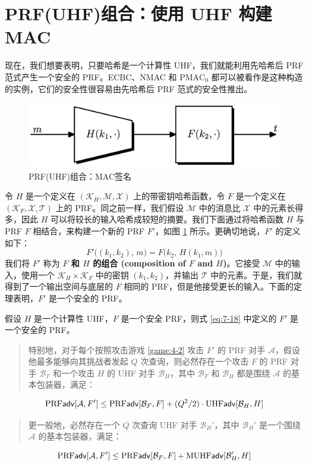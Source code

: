 \section{PRF(UHF)组合：使用 UHF 构建 MAC}

现在，我们想要表明，只要哈希是一个计算性 UHF，我们就能利用先哈希后 PRF 范式产生一个安全的 PRF。ECBC、NMAC 和 $\mathrm{PMAC}_0$ 都可以被看作是这种构造的实例，它们的安全性很容易由先哈希后 PRF 范式的安全性推出。

\begin{figure}
  \centering
  \includegraphics[width=0.5\linewidth]{figures/chapter7/fig3.png}
  \caption{PRF(UHF)组合：MAC签名}
  \label{fig:7-3}
\end{figure}

令 $H$ 是一个定义在 $(\mathcal{K}_H,\mathcal{M},\mathcal{X})$ 上的带密钥哈希函数，令 $F$ 是一个定义在 $(\mathcal{K}_F,\mathcal{X},\mathcal{T})$ 上的 PRF。同之前一样，我们假设 $\mathcal{M}$ 中的消息比 $\mathcal{X}$ 中的元素长得多，因此 $H$ 可以将较长的输入哈希成较短的摘要。我们下面通过将哈希函数 $H$ 与 PRF $F$ 相结合，来构建一个新的 PRF $F'$，如图 \ref{fig:7-3} 所示。更确切地说，$F'$ 的定义如下：
\begin{equation}\label{eq:7-18}
F'\big((k_1,k_2),\,m\big)=F\big(k_2,\,H(k_1,m)\big)
\end{equation}
我们将 $F'$ 称为 \textbf{$F$ 和 $H$ 的组合 (composition of $F$ and $H$)}。它接受 $\mathcal{M}$ 中的输入，使用一个 $\mathcal{K}_H\times\mathcal{K}_F$ 中的密钥 $(k_1,k_2)$，并输出 $\mathcal{T}$ 中的元素。于是，我们就得到了一个输出空间与底层的 $F$ 相同的 PRF，但是他接受更长的输入。下面的定理表明，$F'$ 是一个安全的 PRF。

\begin{theorem}\label{theo:7-7}
假设 $H$ 是一个计算性 UHF，$F$ 是一个安全 PRF，则式 \ref{eq:7-18} 中定义的 $F'$ 是一个安全的 PRF。
\begin{quote}
特别地，对于每个按照攻击游戏 \ref{game:4-2} 攻击 $F'$ 的 PRF 对手 $\mathcal{A}$，假设他最多能够向其挑战者发起 $Q$ 次查询，则必然存在一个攻击 $F$ 的 PRF 对手 $\mathcal{B}_F$ 和一个攻击 $H$ 的 UHF 对手 $\mathcal{B}_H$，其中 $\mathcal{B}_F$ 和 $\mathcal{B}_H$ 都是围绕 $\mathcal{A}$ 的基本包装器，满足：
\end{quote}
\begin{equation}\label{eq:7-19}
{\rm PRF}\mathsf{adv}[\mathcal{A},F']\leq{\rm PRF}\mathsf{adv}[\mathcal{B}_F,F]+{(Q^2/2)}\cdot{\rm UHF}\mathsf{adv}[\mathcal{B}_H,H]
\end{equation}
\begin{quote}
更一般地，必然存在一个 $Q$ 次查询 UHF 对手 $\mathcal{B}_H'$，其中 $\mathcal{B}_H'$ 是一个围绕 $\mathcal{A}$ 的基本包装器，满足：
\end{quote}
\begin{equation}\label{eq:7-20}
{\rm PRF}\mathsf{adv}[\mathcal{A},F']\leq{\rm PRF}\mathsf{adv}[\mathcal{B}_F,F]+{\rm MUHF}\mathsf{adv}[\mathcal{B}_H',H]
\end{equation}
\end{theorem}

